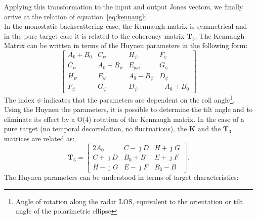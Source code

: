\documentclass[11pt]{article}
\begin{document}
Applying this transformation to the input and output Jones vectors, we finally arrive at the relation of equation~\ref{eq:kennaugh}.\\
In the monostatic backscattering case, the Kennaugh matrix is symmetrical and in the pure target case it is related to the coherency matrix $\mathbf{T}_{3}$.
The Kennaugh Matrix can be written in terms of the Huynen parameters in the following form:
\begin{equation}
	\begin{bmatrix}
		A_{0} + B_{0} & C_{\psi} & H_{\psi} & F_{\psi} \\
		C_{\psi} & A_{0} + B_{\psi} & E_{psi} & G_{\psi} \\
		H_{\psi} & E_{\psi} & A_{0} - B_{\psi} & D_{\psi}\\
		F_{\psi} & G_{\psi} & D_{\psi} & -A_{0} + B_{0}
	\end{bmatrix}
\end{equation}
The index $\psi$ indicates that the parameters are dependent on the roll angle\footnote{Angle of rotation along the radar LOS, equivalent to the orientation or tilt angle of the polarimetric ellipse}.
Using the Huynen the parameters, it is possible to determine the tilt angle and to eliminate its effect by a O(4) rotation of the Kennaugh matrix.
In the case of a pure target (no temporal decorrelation, no fluctuations), the $\mathbf{K}$ and the $\mathbf{T}_{3}$ matrices are related as:
\begin{equation}
	\mathbf{T}_{3} = 
	\begin{bmatrix}
		2A_{0} & C - \jmath D & H + \jmath G\\
		C + \jmath D & B_{0} + B & E + \jmath F\\
		H - \jmath G & E - \jmath F & B_0 - B
	\end{bmatrix}.
\end{equation}
The Huynen parameters can be understood in terms of target characteristics:
\end{document}
